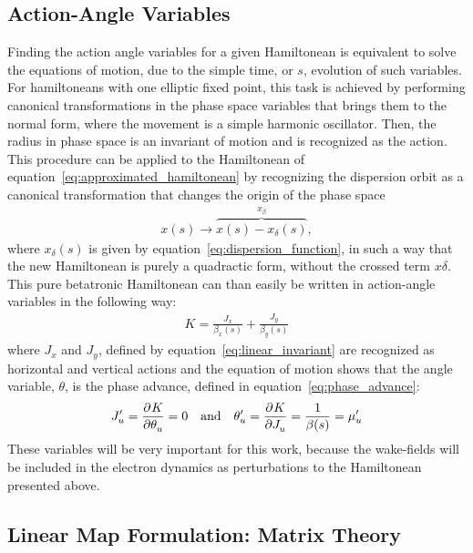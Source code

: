 \subsection{Action-Angle Variables}

    Finding the action angle variables for a given Hamiltonean is equivalent to solve the equations of motion, due to the simple time, or $s$, evolution of such variables. For  hamiltoneans with one elliptic fixed point, this task is achieved by performing canonical transformations in the phase space variables that brings them to the normal form, where the movement is a simple harmonic oscillator. Then, the radius in phase space is an invariant of motion and is recognized as the action. This procedure can be applied to the Hamiltonean of equation~\eqref{eq:approximated_hamiltonean} by recognizing the dispersion orbit as a canonical transformation that changes the origin of the phase space~\cite[Appendix A2]{Berg1996}
    \begin{align}\label{eq:off_momentum_canonical_transformation}
        x (s) \to \overbrace{x(s) - x_\delta (s)}^{x_\beta},
    \end{align}
    where $x_\delta (s)$ is given by equation~\eqref{eq:dispersion_function}, in such a way that the new Hamiltonean is purely a quadractic form, without the crossed term $x\delta$. This pure betatronic Hamiltonean can than easily be written in action-angle variables in the following way:
    \begin{align}\label{eq:betatron_hamiltonean}
        K = \frac{J_x}{\beta_x(s)} + \frac{J_y}{\beta_y(s)}
    \end{align}
    where $J_x$ and $J_y$, defined by equation~\eqref{eq:linear_invariant} are recognized as horizontal and vertical actions and the equation of motion shows that the angle variable, $\theta$, is the phase advance, defined in equation~\eqref{eq:phase_advance}:
    \begin{align}
        J'_u = \frac{\partial^{{}}K}{\partial \theta_u^{{}}} = 0 \quad \text{and} \quad \theta'_u = \frac{\partial^{{}}K}{\partial J_u^{{}}} = \frac{1}{\beta(s)} = \mu'_u
    \end{align}
    These variables will be very important for this work, because the wake-fields will be included in the electron dynamics as perturbations to the Hamiltonean presented above.

\subsection{Linear Map Formulation: Matrix Theory}

